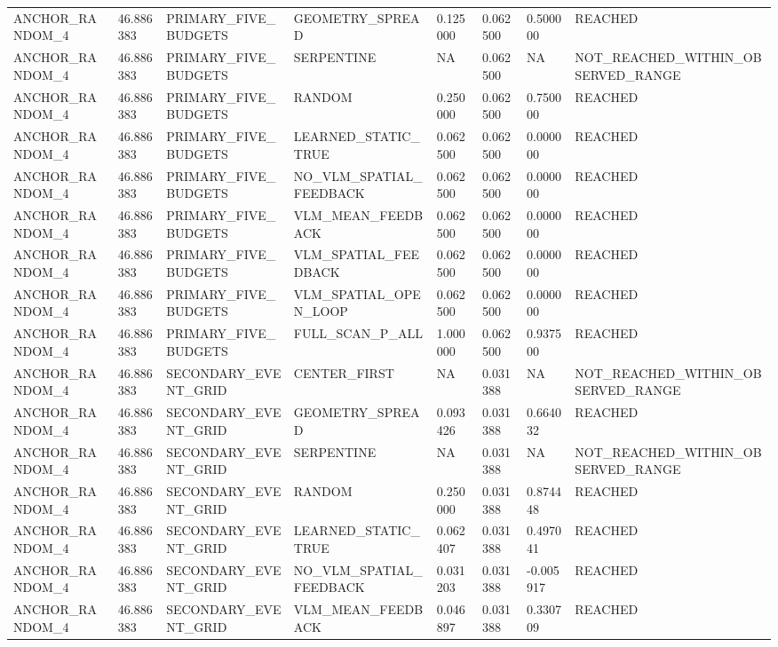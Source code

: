 \begin{tabular}{llllllll}
ANCHOR\_RANDOM\_4 & 46.886383 & PRIMARY\_FIVE\_BUDGETS & GEOMETRY\_SPREAD & 0.125000 & 0.062500 & 0.500000 & REACHED \\
ANCHOR\_RANDOM\_4 & 46.886383 & PRIMARY\_FIVE\_BUDGETS & SERPENTINE & NA & 0.062500 & NA & NOT\_REACHED\_WITHIN\_OBSERVED\_RANGE \\
ANCHOR\_RANDOM\_4 & 46.886383 & PRIMARY\_FIVE\_BUDGETS & RANDOM & 0.250000 & 0.062500 & 0.750000 & REACHED \\
ANCHOR\_RANDOM\_4 & 46.886383 & PRIMARY\_FIVE\_BUDGETS & LEARNED\_STATIC\_TRUE & 0.062500 & 0.062500 & 0.000000 & REACHED \\
ANCHOR\_RANDOM\_4 & 46.886383 & PRIMARY\_FIVE\_BUDGETS & NO\_VLM\_SPATIAL\_FEEDBACK & 0.062500 & 0.062500 & 0.000000 & REACHED \\
ANCHOR\_RANDOM\_4 & 46.886383 & PRIMARY\_FIVE\_BUDGETS & VLM\_MEAN\_FEEDBACK & 0.062500 & 0.062500 & 0.000000 & REACHED \\
ANCHOR\_RANDOM\_4 & 46.886383 & PRIMARY\_FIVE\_BUDGETS & VLM\_SPATIAL\_FEEDBACK & 0.062500 & 0.062500 & 0.000000 & REACHED \\
ANCHOR\_RANDOM\_4 & 46.886383 & PRIMARY\_FIVE\_BUDGETS & VLM\_SPATIAL\_OPEN\_LOOP & 0.062500 & 0.062500 & 0.000000 & REACHED \\
ANCHOR\_RANDOM\_4 & 46.886383 & PRIMARY\_FIVE\_BUDGETS & FULL\_SCAN\_P\_ALL & 1.000000 & 0.062500 & 0.937500 & REACHED \\
ANCHOR\_RANDOM\_4 & 46.886383 & SECONDARY\_EVENT\_GRID & CENTER\_FIRST & NA & 0.031388 & NA & NOT\_REACHED\_WITHIN\_OBSERVED\_RANGE \\
ANCHOR\_RANDOM\_4 & 46.886383 & SECONDARY\_EVENT\_GRID & GEOMETRY\_SPREAD & 0.093426 & 0.031388 & 0.664032 & REACHED \\
ANCHOR\_RANDOM\_4 & 46.886383 & SECONDARY\_EVENT\_GRID & SERPENTINE & NA & 0.031388 & NA & NOT\_REACHED\_WITHIN\_OBSERVED\_RANGE \\
ANCHOR\_RANDOM\_4 & 46.886383 & SECONDARY\_EVENT\_GRID & RANDOM & 0.250000 & 0.031388 & 0.874448 & REACHED \\
ANCHOR\_RANDOM\_4 & 46.886383 & SECONDARY\_EVENT\_GRID & LEARNED\_STATIC\_TRUE & 0.062407 & 0.031388 & 0.497041 & REACHED \\
ANCHOR\_RANDOM\_4 & 46.886383 & SECONDARY\_EVENT\_GRID & NO\_VLM\_SPATIAL\_FEEDBACK & 0.031203 & 0.031388 & -0.005917 & REACHED \\
ANCHOR\_RANDOM\_4 & 46.886383 & SECONDARY\_EVENT\_GRID & VLM\_MEAN\_FEEDBACK & 0.046897 & 0.031388 & 0.330709 & REACHED \\

\end{tabular}
